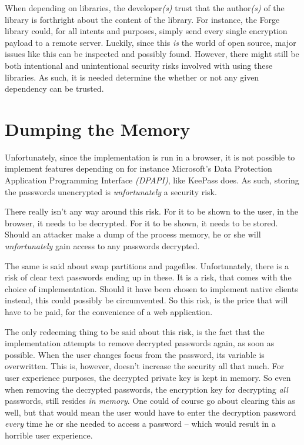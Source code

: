 		When depending on libraries, the developer\emph{(s)} trust that the author\emph{(s)} of the library is forthright about the content of the library. For instance, the Forge library could, for all intents and purposes, simply send every single encryption payload to a remote server. Luckily, since this \emph{is} the world of open source, major issues like this can be inspected and possibly found. However, there might still be both intentional and unintentional security risks involved with using these libraries. As such, it is needed determine the whether or not any given dependency can be trusted.

	\section{Dumping the Memory}
		Unfortunately, since the implementation is run in a browser, it is not possible to implement features depending on for instance Microsoft's Data Protection Application Programming Interface \emph{(DPAPI)}, like KeePass does. As such, storing the passwords unencrypted is \emph{unfortunately} a security risk.

		There really isn't any way around this risk. For it to be shown to the user, in the browser, it needs to be decrypted. For it to be shown, it needs to be stored. Should an attacker make a dump of the process memory, he or she will \emph{unfortunately} gain access to any passwords decrypted. 

		The same is said about swap partitions and pagefiles. Unfortunately, there is a risk of clear text passwords ending up in these. It is a risk, that comes with the choice of implementation. Should it have been chosen to implement native clients instead, this could possibly be circumvented. So this risk, is the price that will have to be paid, for the convenience of a web application.

		The only redeeming thing to be said about this risk, is the fact that the implementation attempts to remove decrypted passwords again, as soon as possible. When the user changes focus from the password, its variable is overwritten. This is, however, doesn't increase the security all that much. For user experience purposes, the decrypted private key is kept in memory. So even when removing the decrypted passwords, the encryption key for decrypting \emph{all} passwords, still resides \emph{in memory}. One could of course go about clearing this as well, but that would mean the user would have to enter the decryption password \emph{every} time he or she needed to access a password -- which would result in a horrible user experience.


